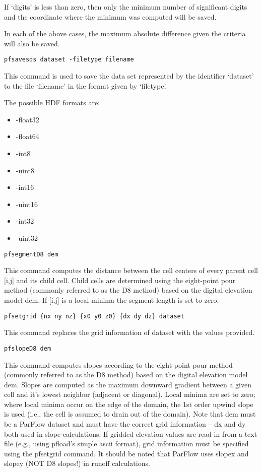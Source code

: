 \begin{description}
If `digits' is less than zero, then only the minimum number of
significant digits and the coordinate where the minimum was
computed will be saved.

In each of the above cases, the maximum absolute difference given
the criteria will also be saved.


\item{\begin{verbatim}pfsavesds dataset -filetype filename\end{verbatim}}
This command is used to save the data set represented by the
identifier `dataset' to the file `filename' in the format given by    
`filetype'.  

The possible HDF formats are:
\begin{itemize}
\item{-float32}
\item{-float64}
\item{-int8}
\item{-uint8}
\item{-int16}
\item{-uint16}
\item{-int32}
\item{-uint32}
\end{itemize}


\item{\begin{verbatim}pfsegmentD8 dem\end{verbatim}}
This command computes the distance between the cell centers of every parent cell [i,j]
and its child cell. Child cells are determined using the eight-point pour method (commonly 
referred to as the D8 method) based on the digital elevation model dem. If [i,j] is a 
local minima the segment length is set to zero.  

\item{\begin{verbatim}pfsetgrid {nx ny nz} {x0 y0 z0} {dx dy dz} dataset\end{verbatim}}
This command replaces the grid information of dataset with the values provided. 

\item{\begin{verbatim}pfslopeD8 dem\end{verbatim}}
This command computes slopes according to the eight-point pour method (commonly
referred to as the D8 method) based on the digital elevation model dem. Slopes 
are computed as the maximum downward gradient between a given cell and it's lowest 
neighbor (adjacent or diagonal). Local minima are set to zero; where local minima 
occur on the edge of the domain, the 1st order upwind slope is used (i.e., the cell 
is assumed to drain out of the domain). Note that dem must be a ParFlow dataset and
must have the correct grid information -- dx and dy both used in slope calculations.
If gridded elevation values are read in from a text file (e.g., using pfload's simple 
ascii format), grid information must be specified using the pfsetgrid command. It should be noted that ParFlow uses slopex and slopey (NOT D8 slopes!) in runoff calculations.



\end{description}
